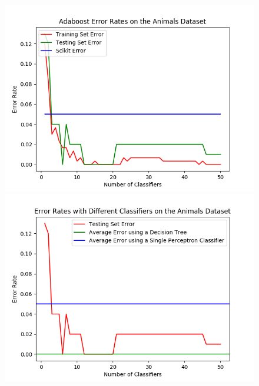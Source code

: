 \documentclass{article}
\begin{document}
\begin{figure}[hbt]
\centering
\includegraphics[scale=0.7]{Animals_1}
\includegraphics[scale=0.7]{Animals_different_classifiers_1} 
\caption{}
\end{figure}
\end{document}
